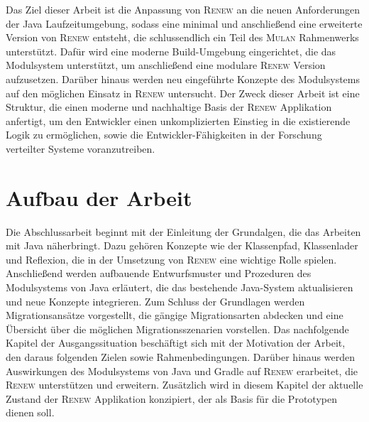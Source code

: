 	Das Ziel dieser Arbeit ist die Anpassung von \textsc{Renew} an die neuen Anforderungen der Java Laufzeitumgebung, sodass eine minimal und anschließend eine erweiterte Version von \textsc{Renew} entsteht, die schlussendlich ein Teil des \textsc{Mulan} Rahmenwerks unterstützt. Dafür wird eine moderne Build-Umgebung eingerichtet, die das Modulsystem unterstützt, um anschließend eine modulare \textsc{Renew} Version aufzusetzen. Darüber hinaus werden neu eingeführte Konzepte des Modulsystems auf den möglichen Einsatz in \textsc{Renew} untersucht. \newline
	Der Zweck dieser Arbeit ist eine Struktur, die einen moderne und nachhaltige Basis der \textsc{Renew} Applikation anfertigt, um den Entwickler einen unkomplizierten Einstieg in die existierende Logik zu ermöglichen, sowie die Entwickler-Fähigkeiten in der Forschung verteilter Systeme voranzutreiben.\bigbreak

\section{Aufbau der Arbeit} \label{sec:AdA}
	Die Abschlussarbeit beginnt mit der Einleitung der Grundalgen, die das Arbeiten mit Java näherbringt. Dazu gehören Konzepte wie der Klassenpfad, Klassenlader und Reflexion, die in der Umsetzung von \textsc{Renew} eine wichtige Rolle spielen. Anschließend werden aufbauende Entwurfsmuster und Prozeduren des Modulsystems von Java erläutert, die das bestehende Java-System aktualisieren und neue Konzepte integrieren. Zum Schluss der Grundlagen werden Migrationsansätze vorgestellt, die gängige Migrationsarten abdecken und eine Übersicht über die möglichen Migrationsszenarien vorstellen.\newline 
	Das nachfolgende Kapitel der Ausgangssituation beschäftigt sich mit der Motivation der Arbeit, den daraus folgenden Zielen sowie Rahmenbedingungen. Darüber hinaus werden Auswirkungen des Modulsystems von Java und Gradle auf \textsc{Renew} erarbeitet, die \textsc{Renew} unterstützen und erweitern. Zusätzlich wird in diesem Kapitel der aktuelle Zustand der \textsc{Renew} Applikation konzipiert, der als Basis für die Prototypen dienen soll. \bigbreak 

